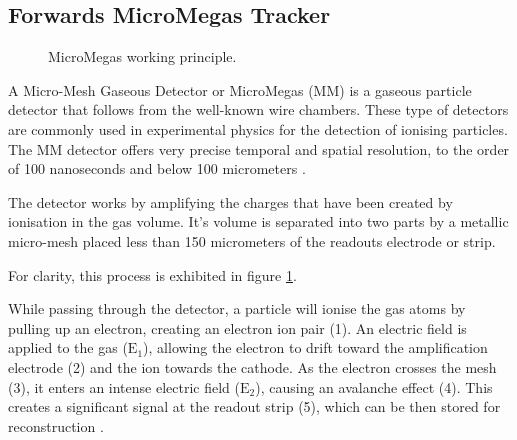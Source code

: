 \subsection{Forwards MicroMegas Tracker} \label{ssec::forwardsmicromegastracker}
    \begin{figure}[b!]
        \centering{}
        \caption[MM working principle.]{MicroMegas working principle.}
        \label{fig::mm_principle}
    \end{figure}

    A Micro-Mesh Gaseous Detector or MicroMegas (MM) is a gaseous particle detector that follows from the well-known wire chambers.
    These type of detectors are commonly used in experimental physics for the detection of ionising particles.
    The MM detector offers very precise temporal and spatial resolution, to the order of 100 nanoseconds and below 100 micrometers \cite{giomataris1996}.

    The detector works by amplifying the charges that have been created by ionisation in the gas volume.
    It's volume is separated into two parts by a metallic micro-mesh placed less than 150 micrometers of the readouts electrode or strip.

    For clarity, this process is exhibited in figure \ref{fig::mm_principle}.

    While passing through the detector, a particle will ionise the gas atoms by pulling up an electron, creating an electron ion pair (1).
    An electric field is applied to the gas ($\text{E}_1$), allowing the electron to drift toward the amplification electrode (2) and the ion towards the cathode.
    As the electron crosses the mesh (3), it enters an intense electric field ($\text{E}_2$), causing an avalanche effect (4).
    This creates a significant signal at the readout strip (5), which can be then stored for reconstruction \cite{giomataris1996}.

